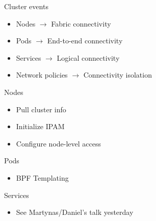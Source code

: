 \documentclass[black,white]{beamer}
\DeclareRobustCommand{\#}{\adjustbox{valign=B,totalheight=.57\baselineskip}{\oldhash}}%
\begin{document}
    \begin{frame}{Cluster events}
        \begin{itemize}
            \item Nodes $\rightarrow$ Fabric connectivity \medskip \pause
            \item Pods $\rightarrow$ End-to-end connectivity \medskip \pause
            \item Services $\rightarrow$ Logical connectivity \medskip \pause
            \item Network policies $\rightarrow$ Connectivity isolation \medskip
        \end{itemize}
    \end{frame}

    \begin{frame}{Nodes}
        \begin{itemize}
            \item Pull cluster info \medskip
            \item Initialize IPAM \medskip
            \item Configure node-level access\medskip
        \end{itemize}
    \end{frame}

    \begin{frame}{Pods}
        \begin{itemize}
            \item BPF Templating \medskip
        \end{itemize}
    \end{frame}

    \begin{frame}{Services}
        \begin{itemize}
            \item See Martynas/Daniel's talk yesterday \medskip
        \end{itemize}
    \end{frame}
\end{document}
